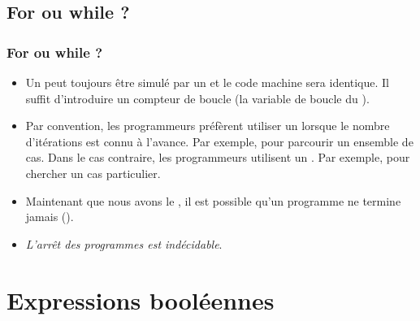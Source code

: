 \documentclass[xcolor=pdftex,svgnames,table]{beamer}
\begin{document}
\subsection{For ou while ?}
\begin{frame}
  \frametitle{For ou while ?}

  \begin{itemize}
  \item Un  peut toujours être simulé par un  et le
    code machine sera identique. Il suffit d'introduire un
    \alert{compteur de boucle} (la variable de boucle du
    ).\pause
\item Par convention, les programmeurs préfèrent utiliser un  lorsque
  le nombre d'itérations est connu à l'avance. Par exemple, pour
  parcourir un ensemble de cas. Dans le cas contraire, les
  programmeurs utilisent un . Par exemple, pour chercher un
  cas particulier.\pause
\item Maintenant que nous avons le , il est possible qu'un
  programme ne termine jamais ().
\item \emph{L'arrêt des programmes est indécidable}.
  \end{itemize}
\end{frame}

\section{Expressions booléennes}
\end{document}

